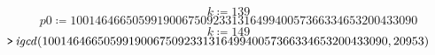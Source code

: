 \documentclass[11pt,a4paper,fleqn]{article}
\begin{document}
\begin{enumerate}[1.]
\begin{enumerate}[(a)]
\begin{flushleft}
\begin{mdframed}
                    \begin{dmath*}
                        k \coloneqq 139
                    \end{dmath*}
                    \vspace{-\bigskipamount}
                    \begin{dmath*}
                        \mathit{p0} \coloneqq 10014646650599190067509233131649940057366334653200433090
                    \end{dmath*}
                    \vspace{-\bigskipamount}
                    \begin{dmath}\label{(3)}
                        k \coloneqq 149
                    \end{dmath}
                    \mapleinput
                    {$ \displaystyle \texttt{>\,} \mathit{igcd} (10014646650599190067509233131649940057366334653200433090,20953) $}


\end{mdframed}
\end{flushleft}
\end{enumerate}
\end{enumerate}
\end{document}
